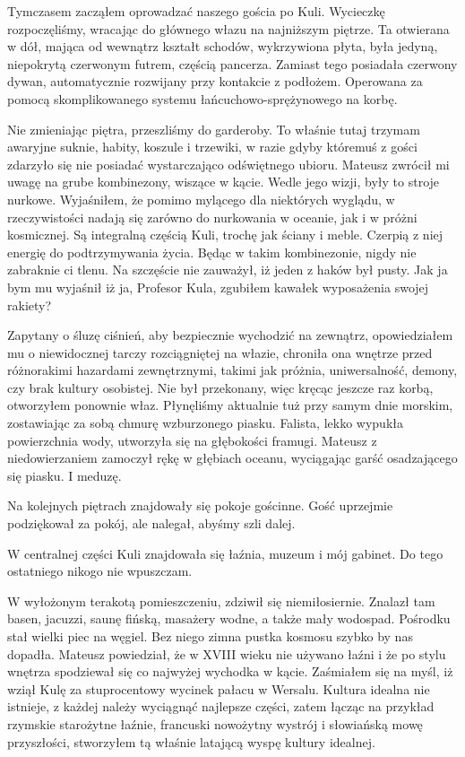 Tymczasem zacząłem oprowadzać naszego gościa po Kuli.
Wycieczkę rozpoczęliśmy, wracając do głównego włazu na najniższym piętrze.
Ta otwierana w dół, mająca od wewnątrz kształt schodów, wykrzywiona płyta, była jedyną, niepokrytą czerwonym futrem, częścią pancerza.
Zamiast tego posiadała czerwony dywan, automatycznie rozwijany przy kontakcie z podłożem.
Operowana za pomocą skomplikowanego systemu łańcuchowo-sprężynowego na korbę.

Nie zmieniając piętra, przeszliśmy do garderoby.
To właśnie tutaj trzymam awaryjne suknie, habity, koszule i trzewiki, w razie gdyby któremuś z gości zdarzyło się nie posiadać wystarczająco odświętnego ubioru.
Mateusz zwrócił mi uwagę na grube kombinezony, wiszące w kącie. Wedle jego wizji, były to stroje nurkowe.
Wyjaśniłem, że pomimo mylącego dla niektórych wyglądu, w rzeczywistości nadają się zarówno do nurkowania w oceanie, jak i w próżni kosmicznej.
Są integralną częścią Kuli, trochę jak ściany i meble. Czerpią z niej energię do podtrzymywania życia. Będąc w takim kombinezonie, nigdy nie zabraknie ci tlenu.
Na szczęście nie zauważył, iż jeden z haków był pusty. Jak ja bym mu wyjaśnił iż ja, Profesor Kula, zgubiłem kawałek wyposażenia swojej rakiety?

Zapytany o śluzę ciśnień, aby bezpiecznie wychodzić na zewnątrz, opowiedziałem mu o niewidocznej tarczy rozciągniętej na włazie, chroniła ona wnętrze przed różnorakimi hazardami zewnętrznymi, takimi jak próżnia, uniwersalność, demony, czy brak kultury osobistej.
Nie był przekonany, więc kręcąc jeszcze raz korbą, otworzyłem ponownie właz. 
Płynęliśmy aktualnie tuż przy samym dnie morskim, zostawiając za sobą chmurę wzburzonego piasku.
Falista, lekko wypukła powierzchnia wody, utworzyła się na głębokości framugi. 
Mateusz z niedowierzaniem zamoczył rękę w głębiach oceanu, wyciągając garść osadzającego się piasku.
I meduzę.

Na kolejnych piętrach znajdowały się pokoje gościnne. Gość uprzejmie podziękował za pokój, ale nalegał, abyśmy szli dalej.

W centralnej części Kuli znajdowała się łaźnia, muzeum i mój gabinet. Do tego ostatniego nikogo nie wpuszczam.

W wyłożonym terakotą pomieszczeniu, zdziwił się niemiłosiernie. Znalazł tam basen, jacuzzi, saunę fińską, masażery wodne, a także mały wodospad.
Pośrodku stał wielki piec na węgiel. Bez niego zimna pustka kosmosu szybko by nas dopadła.
Mateusz powiedział, że w XVIII wieku nie używano łaźni i że po stylu wnętrza spodziewał się co najwyżej wychodka w kącie. 
Zaśmiałem się na myśl, iż wziął Kulę za stuprocentowy wycinek pałacu w Wersalu.
Kultura idealna nie istnieje, z każdej należy wyciągnąć najlepsze części, zatem łącząc na przykład rzymskie starożytne łaźnie, francuski nowożytny wystrój i słowiańską mowę przyszłości, 
stworzyłem tą właśnie latającą wyspę kultury idealnej.

